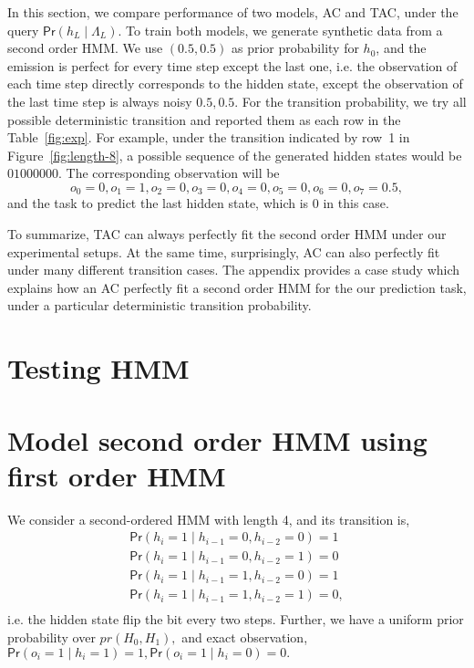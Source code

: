 \documentclass{article}
\def\pr{{\mathsf{Pr}}}
\begin{document}
In this section, we compare performance of two models, AC and TAC, under the query \(\pr(h_L \mid \Lambda_L).\)
To train both models, we generate synthetic data from a second order HMM.
We use \((0.5,0.5)\) as prior probability for \(h_0\), and the emission is perfect for every time step except the last one, i.e. the observation of each time step directly corresponds to the hidden state, except the observation of the last time step is always noisy \(0.5, 0.5\).
For the transition probability, we try all possible deterministic transition and reported them as each row in the Table~\ref{fig:exp}. For example, under the transition indicated by row~1 in Figure~\ref{fig:length-8}, a possible sequence of the generated hidden states would be \(01000000.\) The corresponding observation will be
\[o_0 = 0, o_1 = 1, o_2 = 0, o_3 = 0, o_4 = 0, o_5 = 0, o_6=0, o_7=0.5,\] and the task to predict the last hidden state, which is \(0\) in this case.

To summarize, TAC can always perfectly fit the second order HMM under our experimental setups.
At the same time, surprisingly, AC can also perfectly fit under many different transition cases. The appendix provides a case study which explains how an AC perfectly fit a second order HMM for the our prediction task, under a particular deterministic transition probability.


\section{Testing HMM }

\newpage
\appendix
\section{Model second order HMM using first order HMM}

We consider a second-ordered HMM with length 4, and its transition is,
\begin{align*}
  \pr(h_i = 1 \mid h_{i-1}=0, h_{i-2}=0) = 1 \\
  \pr(h_i = 1 \mid h_{i-1}=0, h_{i-2}=1) = 0 \\
  \pr(h_i = 1 \mid h_{i-1}=1, h_{i-2}=0) = 1 \\
  \pr(h_i = 1 \mid h_{i-1}=1, h_{i-2}=1) = 0, \\
\end{align*}
i.e. the hidden state flip the bit every two steps. Further, we have a uniform prior probability over \(pr(H_0, H_1),\) and exact observation, \(\pr(o_i=1 \mid h_i =1) = 1, \pr(o_i=1 \mid h_i =0) = 0.\)
\end{document}
